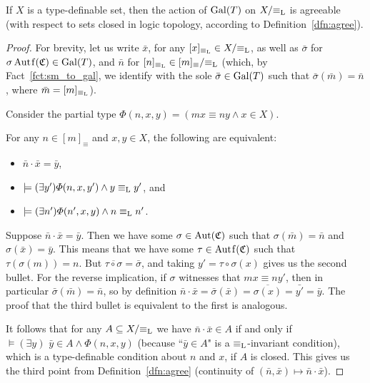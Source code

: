 	\begin{lem}
		\label{lem:agree_aut}
		If $X$ is a type-definable set, then the action of $\operatorname{{Gal}}(T)$ on $X/{\equiv_{\mathrm{L}}}$ is agreeable (with respect to sets closed in logic topology, according to Definition~\ref{dfn:agree}).
	\end{lem}
	\begin{proof}
		For brevity, let us write $\bar x$, for any $[x]_{\equiv_{\mathrm{L}}} \in X/{\equiv_{\mathrm{L}}}$, as well as $\bar \sigma$ for $\sigma\Autf(\fC)\in \Gal(T)$, and $\bar n$ for $[n]_{\equiv_{\mathrm{L}}}\in [m]_\equiv/{\equiv_{\mathrm{L}}}$ (which, by Fact~\ref{fct:sm_to_gal}, we identify with the sole $\bar{\sigma}\in \operatorname{{Gal}}(T)$ such that $\bar{\sigma}(\bar m)=\bar n$, where $\bar m=[m]_{\equiv_{\mathrm{L}}}$).
		
		Consider the partial type $\Phi(n,x,y)= (mx\equiv ny\land x\in X)$.
		\begin{clm*}
			For any $n\in [m]_\equiv$ and $x,y\in X$, the following are equivalent:
			\begin{itemize}
				\item
				$\bar n\cdot \bar x=\bar y$,
				\item
				$\models (\exists y')\Phi(n,x,y')\land y\equiv_{\mathrm{L}} y'$, and
				\item
				$\models (\exists n')\Phi(n',x,y)\land n\equiv_{\mathrm{L}} n'$.
			\end{itemize}
		\end{clm*}
		\begin{clmproof}
			Suppose $\bar n\cdot \bar x=\bar y$. Then we have some $\sigma\in \operatorname{{Aut}}({\mathfrak C})$ such that $\sigma(\bar m)=\bar n$ and $\sigma(\bar x)=\bar y$. This means that we have some $\tau\in \Autf(\fC)$ such that $\tau(\sigma(m))=n$. But $\overline{\tau\circ \sigma}=\bar \sigma$, and taking $y'=\tau\circ\sigma(x)$ gives us the second bullet. For the reverse implication, if $\sigma$ witnesses that $mx\equiv ny'$, then in particular $\bar{\sigma}(\bar m)=\bar{n}$, so by definition $\bar n\cdot \bar x=\bar{\sigma}(\bar x)=\overline{\sigma(x)}=\bar {y'}=\bar y$. The proof that the third bullet is equivalent to the first is analogous.
		\end{clmproof}
		
		It follows that for any $A\subseteq X/{\equiv_{\mathrm{L}}}$ we have $\bar n\cdot \bar x\in A$ if and only if $\models (\exists y)\,\, \bar y\in A\land \Phi(n,x,y)$ (because ``$\bar y\in A$" is a $\equiv_{\mathrm{L}}$-invariant condition), which is a type-definable condition about $n$ and $x$, if $A$ is closed. This gives us the third point from Definition~\ref{dfn:agree} (continuity of $(\bar n,\bar x)\mapsto \bar n\cdot \bar x$).
		

\end{proof}
